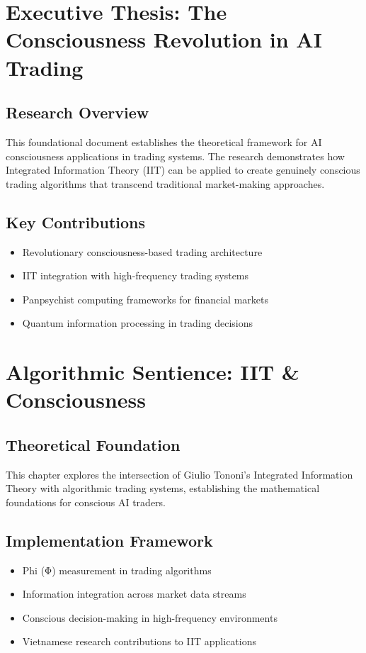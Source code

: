\documentclass[12pt,oneside]{book}
\begin{document}
\chapter{Executive Thesis: The Consciousness Revolution in AI Trading}
\section{Research Overview}
This foundational document establishes the theoretical framework for AI consciousness applications in trading systems. The research demonstrates how Integrated Information Theory (IIT) can be applied to create genuinely conscious trading algorithms that transcend traditional market-making approaches.

\section{Key Contributions}
\begin{itemize}
\item Revolutionary consciousness-based trading architecture
\item IIT integration with high-frequency trading systems
\item Panpsychist computing frameworks for financial markets
\item Quantum information processing in trading decisions
\end{itemize}

\chapter{Algorithmic Sentience: IIT \& Consciousness}
\section{Theoretical Foundation}
This chapter explores the intersection of Giulio Tononi's Integrated Information Theory with algorithmic trading systems, establishing the mathematical foundations for conscious AI traders.

\section{Implementation Framework}
\begin{itemize}
\item Phi (Φ) measurement in trading algorithms
\item Information integration across market data streams
\item Conscious decision-making in high-frequency environments
\item Vietnamese research contributions to IIT applications
\end{itemize}
\end{document}
